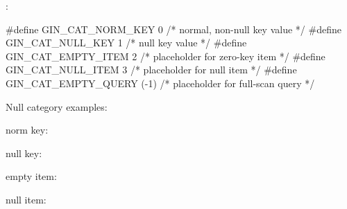 :

\begin{ccode}
#define GIN_CAT_NORM_KEY        0   /* normal, non-null key value */
#define GIN_CAT_NULL_KEY        1   /* null key value */
#define GIN_CAT_EMPTY_ITEM      2   /* placeholder for zero-key item */
#define GIN_CAT_NULL_ITEM       3   /* placeholder for null item */
#define GIN_CAT_EMPTY_QUERY     (-1)    /* placeholder for full-scan query */
\end{ccode}

Null category examples:

\begin{oparts}
\item norm key:
\item null key:
\item empty item:
\item null item:
\end{oparts}
